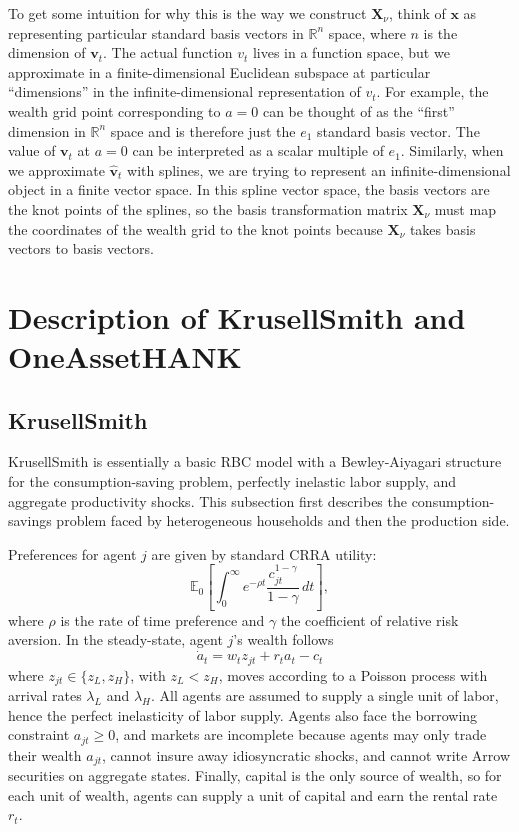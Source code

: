 \documentclass[12 pt, oneside]{article}
\theoremstyle{definition}
\theoremstyle{definition}
\theoremstyle{definition}
\newcommand{\bfx}{\mathbf{x}}
\newcommand{\bfv}{\mathbf{v}}
\newcommand{\bfX}{\mathbf{X}}
\newcommand{\R}{\mathbb{R}}
\newcommand{\E}{\mathbb{E}}
\begin{document}
To get some intuition for why this is the way we construct $\bfX_\nu$, think of $\bfx$ as representing particular standard basis vectors in $\R^n$ space, where $n$ is the dimension of $\bfv_t$. The actual function $v_t$ lives in a function space, but we approximate in a finite-dimensional Euclidean subspace at particular ``dimensions'' in the infinite-dimensional representation of $v_t$. For example, the wealth grid point corresponding to $a = 0$ can be thought of as the ``first'' dimension in $\R^n$ space and is therefore just the $e_1$ standard basis vector. The value of $\bfv_t$ at $a = 0$ can be interpreted as a scalar multiple of $e_1$. Similarly, when we approximate $\hat{\bfv}_t$ with splines, we are trying to represent an infinite-dimensional object in a finite vector space. In this spline vector space, the basis vectors are the knot points of the splines, so the basis transformation matrix $\bfX_\nu$ must map the coordinates of the wealth grid to the knot points because $\bfX_\nu$ takes basis vectors to basis vectors.

\section{Description of KrusellSmith and OneAssetHANK}
\subsection{KrusellSmith}
KrusellSmith is essentially a basic RBC model with a Bewley-Aiyagari structure for the consumption-saving problem, perfectly inelastic labor supply, and aggregate productivity shocks. This subsection first describes the consumption-savings problem faced by heterogeneous households and then the production side.

Preferences for agent $j$ are given by standard CRRA utility:
\[\E_0\left[\int_0^\infty e^{-\rho t}\dfrac{c_{jt}^{1-\gamma}}{1-\gamma}\,dt \right], \]
where $\rho$ is the rate of time preference and $\gamma$ the coefficient of relative risk aversion. In the steady-state, agent $j$'s wealth follows
\[\dot{a}_t =  w_t z_{jt} + r_ta_t -c_t \]
where $z_{jt}\in \{z_L, z_H\}$, with $z_L< z_H$, moves according to a Poisson process with arrival rates $\lambda_L$ and $\lambda_H$. All agents are assumed to supply a single unit of labor, hence the perfect inelasticity of labor supply. Agents also face the borrowing constraint $a_{jt}\geq 0$, and markets are incomplete because agents may only trade their wealth $a_{jt}$, cannot insure away idiosyncratic shocks, and cannot write Arrow securities on aggregate states. Finally, capital is the only source of wealth, so for each unit of wealth, agents can supply a unit of capital and earn the rental rate $r_t$.
\end{document}
